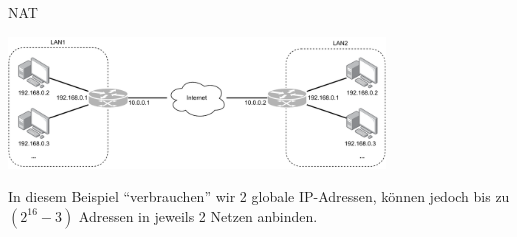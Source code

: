\begin{example}{NAT}
    \begin{center}
        \includegraphics[width=0.75\textwidth]{includes/figures/defi_nat.pdf}
    \end{center}

    In diesem Beispiel \enquote{verbrauchen} wir 2 globale IP-Adressen, können jedoch bis zu $(2^{16} - 3)$ Adressen in jeweils 2 Netzen anbinden.
\end{example}

